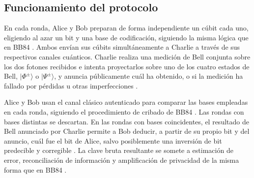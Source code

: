 \subsection{Funcionamiento del protocolo}

En cada ronda, Alice y Bob preparan de forma independiente un cúbit cada uno, eligiendo al azar un bit y una base de codificación, siguiendo la misma lógica que en BB84 \citep{bennett1984,lo2012}. Ambos envían sus cúbits simultáneamente a Charlie a través de sus respectivos canales cuánticos. Charlie realiza una medición de Bell conjunta sobre los dos fotones recibidos e intenta proyectarlos sobre uno de los cuatro estados de Bell, $|\Phi^\pm\rangle$ o $|\Psi^\pm\rangle$, y anuncia públicamente cuál ha obtenido, o si la medición ha fallado por pérdidas u otras imperfecciones \citep{lo2012,braunstein2012}.

Alice y Bob usan el canal clásico autenticado para comparar las bases empleadas en cada ronda, siguiendo el procedimiento de cribado de BB84 \citep{bennett1984}. Las rondas con bases distintas se descartan. En las rondas con bases coincidentes, el resultado de Bell anunciado por Charlie permite a Bob deducir, a partir de su propio bit y del anuncio, cuál fue el bit de Alice, salvo posiblemente una inversión de bit predecible y corregible \citep{lo2012,curty2014}. La clave bruta resultante se somete a estimación de error, reconciliación de información y amplificación de privacidad de la misma forma que en BB84 \citep{brassard1994,bennett1995,scarani2009}.

